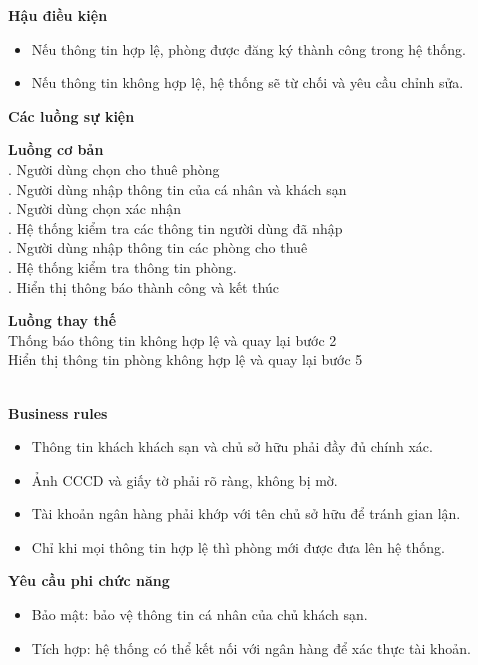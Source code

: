 \textbf{Hậu điều kiện}
\begin{itemize}
    \item Nếu thông tin hợp lệ, phòng được đăng ký thành công trong hệ thống.
    \item Nếu thông tin không hợp lệ, hệ thống sẽ từ chối và yêu cầu chỉnh sửa.
\end{itemize}

\textbf{Các luồng sự kiện}

\begin{small}
\textbf{Luồng cơ bản}\\
. Người dùng chọn cho thuê phòng\\
. Người dùng nhập thông tin của cá nhân và khách sạn\\
. Người dùng chọn xác nhận\\
. Hệ thống kiểm tra các thông tin người dùng đã nhập\\
. Người dùng nhập thông tin các phòng cho thuê\\
. Hệ thống kiểm tra thông tin phòng.\\
. Hiển thị thông báo thành công và kết thúc

\textbf{Luồng thay thế}\\
 Thống báo thông tin không hợp lệ và quay lại bước 2\\
 Hiển thị thông tin phòng không hợp lệ và quay lại bước 5\\
\end{small}\\
\textbf{\indent Business rules}
\begin{itemize}
    \item Thông tin khách khách sạn và chủ sở hữu phải đầy đủ chính xác.
    \item Ảnh CCCD và giấy tờ phải rõ ràng, không bị mờ.
    \item Tài khoản ngân hàng phải khớp với tên chủ sở hữu để tránh gian lận.
    \item Chỉ khi mọi thông tin hợp lệ thì phòng mới được đưa lên hệ thống.
\end{itemize}

\textbf{Yêu cầu phi chức năng}
\begin{itemize}
    \item Bảo mật: bảo vệ thông tin cá nhân của chủ khách sạn.
    \item Tích hợp: hệ thống có thể kết nối với ngân hàng để xác thực tài khoản.
\end{itemize}

